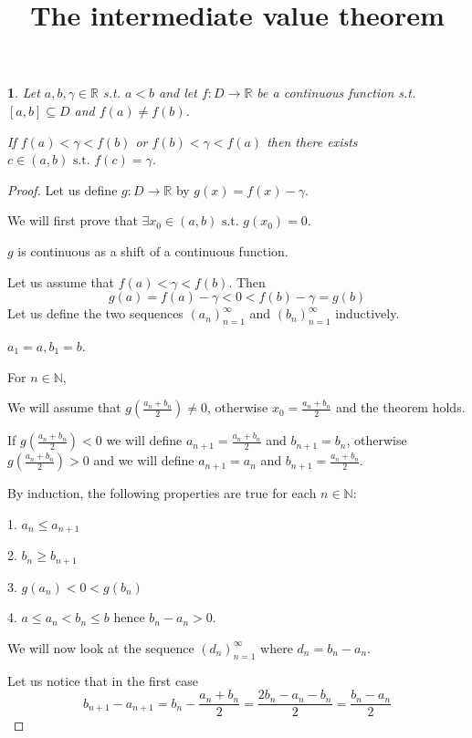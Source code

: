 \documentclass[english]{article}
\theoremstyle{plain}
\newtheorem*{thm*}{\protect\theoremname}
\providecommand{\theoremname}{Theorem}
\begin{document}
\title{{\Large\vspace{-4em}The intermediate value theorem\vspace{-2em}}}
\maketitle
\begin{thm*}
Let $a,b,\gamma\in\mathbb{R}$ s.t. $a<b$ and let $f:D\rightarrow\mathbb{R}$
be a continuous function s.t. $\left[a,b\right]\subseteq D$ and $f(a)\ne f(b)$. 

If $f(a)<\gamma<f(b)$ or $f(b)<\gamma<f(a)$ then there exists $c\in(a,b)\text{ s.t. }f(c)=\gamma$.
\end{thm*}
\begin{proof}
Let us define $g:D\rightarrow\mathbb{R}$ by $g(x)=f(x)-\gamma$.

We will first prove that $\exists x_{0}\in\left(a,b\right)\text{ s.t. }g\left(x_{0}\right)=0$.

$g$ is continuous as a shift of a continuous function. 

Let us assume that $f(a)<\gamma<f(b)$. Then
\[
g(a)=f(a)-\gamma<0<f(b)-\gamma=g(b)
\]
Let us define the two sequences $\left(a_{n}\right)_{n=1}^{\infty}$
and $\left(b_{n}\right)_{n=1}^{\infty}$ inductively. 

$a_{1}=a,b_{1}=b$.

For $n\in\mathbb{N}$,

We will assume that $g\left(\frac{a_{n}+b_{n}}{2}\right)\ne0$, otherwise
$x_{0}=\frac{a_{n}+b_{n}}{2}$ and the theorem holds.

If $g\left(\frac{a_{n}+b_{n}}{2}\right)<0$ we will define $a_{n+1}=\frac{a_{n}+b_{n}}{2}$
and $b_{n+1}=b_{n}$, otherwise $g\left(\frac{a_{n}+b_{n}}{2}\right)>0$
and we will define $a_{n+1}=a_{n}$ and $b_{n+1}=\frac{a_{n}+b_{n}}{2}$.

By induction, the following properties are true for each $n\in\mathbb{N}$:

1. $a_{n}\le a_{n+1}$

2. $b_{n}\ge b_{n+1}$

3. $g\left(a_{n}\right)<0<g\left(b_{n}\right)$

4. $a\le a_{n}<b_{n}\le b$ hence $b_{n}-a_{n}>0$.

We will now look at the sequence $\left(d_{n}\right)_{n=1}^{\infty}$
where $d_{n}=b_{n}-a_{n}$.

Let us notice that in the first case
\[
b_{n+1}-a_{n+1}=b_{n}-\frac{a_{n}+b_{n}}{2}=\frac{2b_{n}-a_{n}-b_{n}}{2}=\frac{b_{n}-a_{n}}{2}
\]


\end{proof}
\end{document}
